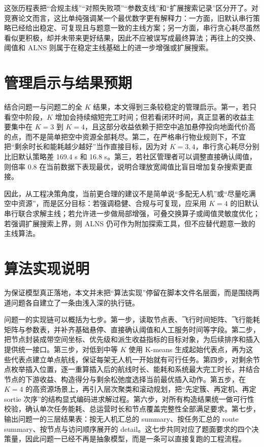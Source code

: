 \documentclass[12pt]{article}
\begin{document}
这张历程表把“合规主线”“对照失败项”“参数支线”和“扩展搜索记录”区分开了。对竞赛论文而言，这比单纯强调某一个最优数字更有解释力：一方面，旧默认串行策略已经给出稳定、可复现且与题意一致的主线方案；另一方面，串行贪心耗尽虽然看似更积极，却并未带来更好结果，因此不应被误写成最终算法；再往上的交换、阈值和 ALNS 则属于在稳定主线基础上的进一步增强或扩展搜索。

\section{管理启示与结果预期}
结合问题一与问题二的全 $K$ 结果，本文得到三条较稳定的管理启示。第一，若只看空中阶段，$K$ 增加会持续缩短完工时间；但若看闭环时间，真正显著的收益主要集中在 $K=3$ 到 $K=4$，且这部分收益依赖于把空中追加悬停投向地面代价高的点，而不是简单把空中资源全部耗尽。第二，在严格串行物业规则下，不宜把“剩余时长和能耗越少越好”当作直接目标，因为对 $K=3,4$，串行贪心耗尽分别比旧默认策略差 169.4 s 和 16.8 s。第三，若社区管理者可以调整直接确认阈值，则倍率 $0.8$ 在当前数据下表现最优，说明合理放宽阈值比盲目增加复杂搜索更直接。

因此，从工程决策角度，当前更合理的建议不是简单说“多配无人机”或“尽量吃满空中资源”，而是区分目标：若强调稳健、合规与可复现，应采用 $K=4$ 的旧默认串行联合求解主线；若允许进一步做局部增强，可叠交换算子或阈值灵敏度优化；若强调扩展搜索上界，则 ALNS 仍可作为附加探索工具，但不应替代题意一致的主线算法。

\section{算法实现说明}
为保证模型真正落地，本文并未把“算法实现”停留在脚本文件名层面，而是围绕两道问题各自建立了一条由浅入深的执行链。

问题一的实现链可以概括为七步。第一步，读取节点表、飞行时间矩阵、飞行能耗矩阵与参数表，并补齐基础悬停、直接确认阈值和人工服务时间等字段。第二步，把节点封装成带空间坐标、优先级和派生收益指标的目标对象，为后续排序和插入提供统一接口。第三步，对低到中等 $K$ 使用 K-means 生成起始代表点，再为这些代表点建立单点航线，保证每架无人机一开始就有可行任务。第四步，对剩余节点枚举插入位置，逐一重算插入后的航线时长、能耗和系统最大完工时长，并结合节点的下游收益、构造得分与剩余松弛度选择当前最优插入动作。第五步，在 $K=4$ 的高资源场景上，再引入层次聚类和滚动规划，把“先定簇、再定机、再定 sortie 次序”的结构显式编码进求解过程。第六步，对所有构造结果统一做可行性校验，确认单次任务能耗、总运营时长和节点覆盖完整性全部满足要求。第七步，输出问题一的三层结果表：按无人机汇总的 summary、按任务汇总的 route summary、按节点与访问顺序展开的 detail。这七步共同对应了题面要求的四个决策量，因此问题一已经不再是抽象模型，而是一条可以直接复跑的工程流程。
\end{document}
